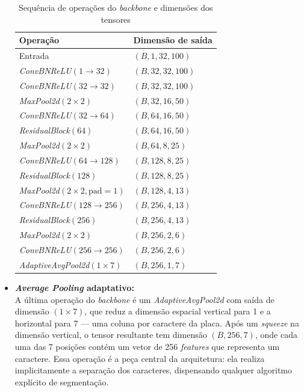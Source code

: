 \begin{itemize}
    \begin{table}[H]
        \centering
        \begin{tabular}{| m{5cm} | m{4cm} |}
            \hline
            Operação & Dimensão de saída \\
            \hline \hline
            Entrada & $(B, 1, 32, 100)$ \\
            \hline
            \textit{ConvBNReLU}$(1 \to 32)$ & $(B, 32, 32, 100)$ \\
            \hline
            \textit{ConvBNReLU}$(32 \to 32)$ & $(B, 32, 32, 100)$ \\
            \hline
            \textit{MaxPool2d}$(2{\times}2)$ & $(B, 32, 16, 50)$ \\
            \hline
            \textit{ConvBNReLU}$(32 \to 64)$ & $(B, 64, 16, 50)$ \\
            \hline
            \textit{ResidualBlock}$(64)$ & $(B, 64, 16, 50)$ \\
            \hline
            \textit{MaxPool2d}$(2{\times}2)$ & $(B, 64, 8, 25)$ \\
            \hline
            \textit{ConvBNReLU}$(64 \to 128)$ & $(B, 128, 8, 25)$ \\
            \hline
            \textit{ResidualBlock}$(128)$ & $(B, 128, 8, 25)$ \\
            \hline
            \textit{MaxPool2d}$(2{\times}2, \text{pad}=1)$ & $(B, 128, 4, 13)$ \\
            \hline
            \textit{ConvBNReLU}$(128 \to 256)$ & $(B, 256, 4, 13)$ \\
            \hline
            \textit{ResidualBlock}$(256)$ & $(B, 256, 4, 13)$ \\
            \hline
            \textit{MaxPool2d}$(2{\times}2)$ & $(B, 256, 2, 6)$ \\
            \hline
            \textit{ConvBNReLU}$(256 \to 256)$ & $(B, 256, 2, 6)$ \\
            \hline
            \textit{AdaptiveAvgPool2d}$(1{\times}7)$ & $(B, 256, 1, 7)$ \\
            \hline
        \end{tabular}
        \caption{Sequência de operações do \textit{backbone} e dimensões dos tensores}
        \label{tab:backbone}
    \end{table}

    \item \textbf{\textit{Average Pooling} adaptativo:} \\
    A última operação do \textit{backbone} é um \textit{AdaptiveAvgPool2d} com saída de dimensão $(1 \times 7)$, que reduz a dimensão espacial vertical para 1 e a horizontal para 7 --- uma coluna por caractere da placa. Após um \textit{squeeze} na dimensão vertical, o tensor resultante tem dimensão $(B, 256, 7)$, onde cada uma das 7 posições contém um vetor de 256 \textit{features} que representa um caractere. Essa operação é a peça central da arquitetura: ela realiza implicitamente a separação dos caracteres, dispensando qualquer algoritmo explícito de segmentação.


\end{itemize}
